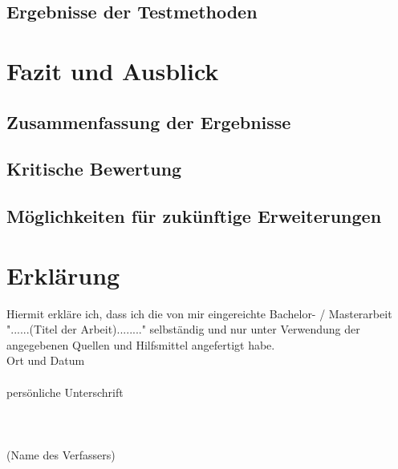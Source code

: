 \documentclass[
pagesize,				%
a4paper,				%
oneside,				%
headsepline,		    %
11pt,					%
halfparskip,		    %
final,					%
listof=totoc,		    %
]{scrartcl}			    %
\begin{document}
\subsection{Ergebnisse der Testmethoden}


\newpage
\section{Fazit und Ausblick}
\label{Fazit und Ausblick}

\subsection{Zusammenfassung der Ergebnisse}

\subsection{Kritische Bewertung}

\subsection{Möglichkeiten für zukünftige Erweiterungen}
\newpage
\renewcommand{\thesection}{\roman{section}}
\clearscrheadings
\clearscrplain
\clearscrheadfoot
\ohead[\pagemark]{\pagemark}
\ihead[\headmark]{\headmark}

\section*{Erklärung}
\label{Erklärung}
Hiermit erkläre ich, dass ich die von mir eingereichte Bachelor- / Masterarbeit
"......(Titel der Arbeit)........" selbständig und nur unter Verwendung der
angegebenen Quellen und Hilfsmittel angefertigt habe.
\\
Ort und Datum
\\
\\
persönliche Unterschrift
\\
\\
\\
\\
(Name des Verfassers)
\end{document}
